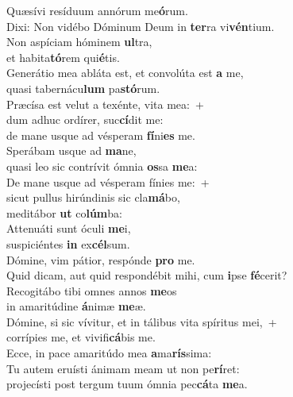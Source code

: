 \evenverse Quæsívi resíduum annórum me\textbf{ó}rum.~\*\\
\evenverse Dixi: Non vidébo Dóminum Deum in \textbf{ter}ra vi\textbf{vén}tium.\\
\oddverse Non aspíciam hóminem \textbf{ul}tra,~\*\\
\oddverse et habita\textbf{tó}rem qui\textbf{é}tis.\\
\evenverse Generátio mea abláta est, et convolúta est \textbf{a} me,~\*\\
\evenverse quasi tabernácu\textbf{lum} pa\textbf{stó}rum.\\
\oddverse Præcísa est velut a texénte, vita mea:~+\\
\oddverse  dum adhuc ordírer, suc\textbf{cí}dit me:~\*\\
\oddverse de mane usque ad vésperam \textbf{fí}ni\textbf{es} me.\\
\evenverse Sperábam usque ad \textbf{ma}ne,~\*\\
\evenverse quasi leo sic contrívit ómnia \textbf{os}sa \textbf{me}a:\\
\oddverse De mane usque ad vésperam fínies me:~+\\
\oddverse  sicut pullus hirúndinis sic cla\textbf{má}bo,~\*\\
\oddverse meditábor \textbf{ut} co\textbf{lúm}ba:\\
\evenverse Attenuáti sunt óculi \textbf{me}i,~\*\\
\evenverse suspiciéntes \textbf{in} ex\textbf{cél}sum.\\
\oddverse Dómine, vim pátior, respónde \textbf{pro} me.~\*\\
\oddverse Quid dicam, aut quid respondébit mihi, cum \textbf{i}pse \textbf{fé}cerit?\\
\evenverse Recogitábo tibi omnes annos \textbf{me}os~\*\\
\evenverse in amaritúdine \textbf{á}nimæ \textbf{me}æ.\\
\oddverse Dómine, si sic vívitur, et in tálibus vita spíritus mei,~+\\
\oddverse  corrípies me, et vivifi\textbf{cá}bis me.~\*\\
\oddverse Ecce, in pace amaritúdo mea \textbf{a}ma\textbf{rís}sima:\\
\evenverse Tu autem eruísti ánimam meam ut non pe\textbf{rí}ret:~\*\\
\evenverse projecísti post tergum tuum ómnia pec\textbf{cá}ta \textbf{me}a.\\

